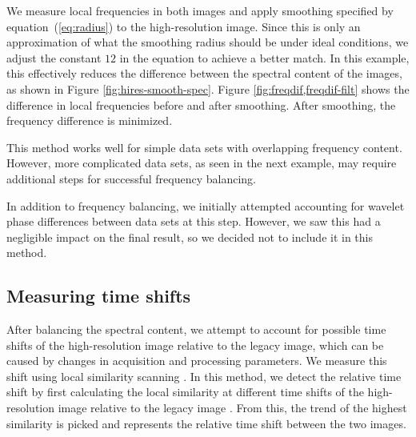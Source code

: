     
    We measure local frequencies in both images and apply smoothing specified by equation~(\ref{eq:radius}) to the high-resolution image.
    Since this is only an approximation of what the smoothing radius should be under ideal conditions, we adjust the constant $12$ in the equation to achieve a better match. 
    In this example, this effectively reduces the difference between the spectral content of the images, as shown in Figure \ref{fig:hires-smooth-spec}. 
    Figure \ref{fig:freqdif,freqdif-filt} shows the difference in local frequencies before and after smoothing. 
    After smoothing, the frequency difference is minimized. 
    
    This method works well for simple data sets with overlapping frequency content. 
    However, more complicated data sets, as seen in the next example, may require additional steps for successful frequency balancing.
    
    In addition to frequency balancing, we initially attempted accounting for wavelet phase differences between data sets at this step. 
    However, we saw this had a negligible impact on the final result, so we decided not to include it in this method.
    

\subsection{Measuring time shifts}

    After balancing the spectral content, we attempt to account for possible time shifts of the high-resolution image relative to the legacy image, which can be caused by changes in acquisition and processing parameters. 
    We measure this shift using local similarity scanning \cite[]{attr, timelapse}. 
    In this method, we detect the relative time shift by first calculating the local similarity at different time shifts of the high-resolution image relative to the legacy image \cite[]{timelapse}. 
    From this, the trend of the highest similarity is picked and represents the relative time shift between the two images.
    
